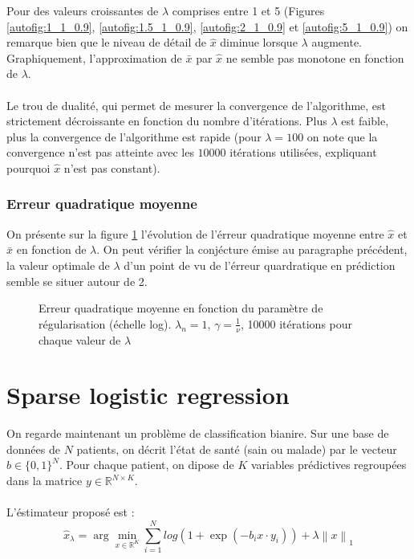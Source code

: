 \documentclass{article}
\newcommand{\Rset}{\mathbb{R}}
\newcommand{\xhat}{{\hat{x}}}
\newcommand{\norm}[2][2]{\left\lVert#2\right\rVert_{#1}}
\newcommand{\autoref}[3]{\ref{autofig:#1_#2_#3}}
\begin{document}
Pour des valeurs croissantes de $\lambda$ comprises entre 1 et 5 (Figures \autoref{1}{1}{0.9}, \autoref{1.5}{1}{0.9}, \autoref{2}{1}{0.9} et \autoref{5}{1}{0.9}) on remarque bien que le niveau de détail de $\xhat$ diminue lorsque $\lambda$ augmente. Graphiquement, l'approximation de $\bar x$ par $\xhat$ ne semble pas monotone en fonction de $\lambda$.

\paragraph{}Le trou de dualité, qui permet de mesurer la convergence de l'algorithme, est strictement décroissante en fonction du nombre d'itérations. Plus $\lambda$ est faible, plus la convergence de l'algorithme est rapide (pour $\lambda = 100$ on note que la convergence n'est pas atteinte avec les $10 000$ itérations utilisées, expliquant pourquoi $\xhat$ n'est pas constant).

\subsubsection{Erreur quadratique moyenne}
On présente sur la figure  \ref{fig:ex1_mse} l'évolution de l'érreur quadratique moyenne entre $\xhat$ et $\bar x$ en fonction de $\lambda$. On peut vérifier la conjécture émise au paragraphe précédent, la valeur optimale de $\lambda$ d'un point de vu de l'érreur quardratique en prédiction semble se situer autour de 2.

\begin{figure}[!ht]
  \centering
  
  \caption{Erreur quadratique moyenne en fonction du paramètre de régularisation (échelle log). $\lambda_n = 1$, $\gamma = \frac{1}{\nu}$, 10000 itérations pour chaque valeur de $\lambda$}
  \label{fig:ex1_mse}
\end{figure}

\section{Sparse logistic regression}
On regarde maintenant un problème de classification bianire. Sur une base de données de $N$ patients, on décrit l'état de santé (sain ou malade) par le vecteur $b \in \{ 0, 1 \}^N$. Pour chaque patient, on dipose de $K$ variables prédictives regroupées dans la matrice $y \in \Rset^{N \times K}$.

\paragraph{}
L'éstimateur proposé est :
\[
\xhat_\lambda = \arg\min_{x \in \Rset^K} \sum_{i = 1}^N  log \left( 1 + \exp(-b_i x\cdot y_i) \right) + \lambda \norm[1]{x}
\]
\end{document}
